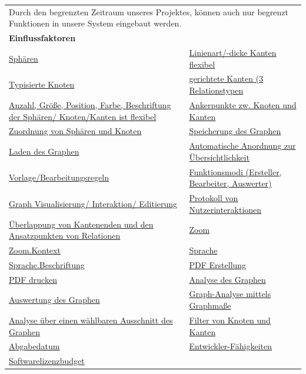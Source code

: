 \documentclass[enabledeprecatedfontcommands,fontsize=11pt,paper=a4,twoside]{scrartcl}
\newcounter{one}
\begin{document}
\newpage
\begin{tabular} {|p{8cm} p{8cm}|}
	\hline
	\rowcolor{prob}\multicolumn{2}{|l|}{\parbox{16cm}{\textbf{16: Begrenzter Funktionsumfang durch Bearbeitszeit}}} \\  \hline\hline 
	\multicolumn{2}{|l|}{\parbox{16cm}{Durch den begrenzten Zeitraum unseres Projektes, können auch nur begrenzt Funktionen in unsere System eingebaut werden.}}\rule{0pt}{4ex}\\ [1ex] \hline
	\multicolumn{2}{|l|}{\textbf{Einflussfaktoren}}\\
	\hyperlink {n}{Sphären} &
	\hyperlink {o}{Linienart/-dicke Kanten flexibel}\\
	\hyperlink {p}{Typisierte Knoten} &
	\hyperlink {q}{gerichtete Kanten (3 Relationstypen} \\
	\hyperlink {r}{Anzahl, Größe, Position, Farbe, Beschriftung der Sphären/ Knoten/Kanten ist flexibel} &
	\hyperlink {s}{Ankerpunkte zw. Knoten und Kanten} \\
	\hyperlink {t}{Zuordnung von Sphären und Knoten} &
	\hyperlink {v}{Speicherung des Graphen} \\
	\hyperlink {w}{Laden des Graphen} &
	\hyperlink {x}{Automatische Anordnung zur Übersichtlichkeit} \\
	\hyperlink {y}{Vorlage/Bearbeitungsregeln} &
	\hyperlink {z}{Funktionsmodi (Ersteller, Bearbeiter, Auswerter)} \\
	\hyperlink {aa}{Graph Visualisierung/ Interaktion/ Editierung}&
	\hyperlink {bb}{Protokoll von Nutzerinteraktionen} \\
	\hyperlink {cc}{Überlappung von Kantenenden und den Ansatzpunkten von Relationen} &
	\hyperlink {ee}{Zoom} \\
	\hyperlink {ff}{Zoom.Kontext} &
	\hyperlink {gg}{Sprache} \\
	\hyperlink {hh}{Sprache.Beschriftung} &
	\hyperlink {kk}{PDF Erstellung} \\
	\hyperlink {ll}{PDF drucken} &
	\hyperlink {oo}{Analyse des Graphen} \\
	\hyperlink {pp}{Auswertung des Graphen} &
	\hyperlink {qq}{Graph-Analyse mittels Graphmaße} \\ 
	\hyperlink {rr}{Analyse über einen wählbaren Ausschnitt des Graphen} &
	\hyperlink {ss}{Filter von Knoten und Kanten} \\
	\hyperlink {uu}{Abgabedatum} &
	\hyperlink {vv}{Entwickler-Fähigkeiten} \\
	\hyperlink {ww}{Softwarelizenzbudget} &

\end{tabular}
\end{document}
